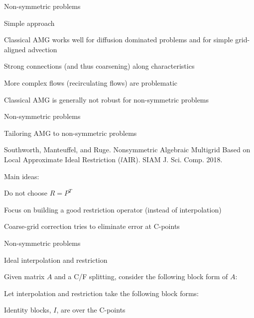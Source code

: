 \documentclass[18pt,xcolor=table]{beamer}
\begin{document}
\begin{frame}{Non-symmetric problems}
\begin{block}{Simple approach}
\bit
\item Classical AMG works well for diffusion dominated problems and for simple grid-aligned advection
\item Strong connections (and thus coarsening) along characteristics
\item More complex flows (recirculating flows) are problematic
\item Classical AMG is generally not robust for non-symmetric problems
\eit
\end{block}
\end{frame}

\begin{frame}{Non-symmetric problems}
\begin{block}{Tailoring AMG to non-symmetric problems}
\bit
\item Southworth, Manteuffel, and Ruge. Nonsymmetric Algebraic Multigrid Based on Local Approximate Ideal Restriction ($l$AIR). SIAM J. Sci. Comp. 2018.
\item Main ideas: 
\bit
\item Do not choose $R = P^T$
\item Focus on building a good restriction operator (instead of interpolation)
\item Coarse-grid correction tries to eliminate error at C-points
\eit
\eit
\end{block}
\end{frame}

\begin{frame}{Non-symmetric problems}
\begin{block}{Ideal interpolation and restriction}
\bit
\item Given matrix $A$ and a C/F splitting, consider the following block form of $A$:
\item Let interpolation and restriction take the following block forms:
\item Identity blocks, $I$, are over the C-points
\eit
\end{block}
\end{frame}
\end{document}
